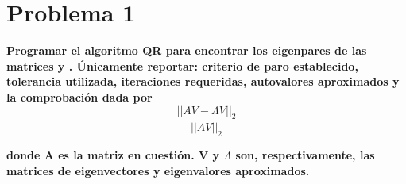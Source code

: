 \section*{Problema 1}
\textbf{Programar el algoritmo QR para encontrar los eigenpares de las matrices  y . Únicamente reportar: criterio de paro establecido, tolerancia utilizada, iteraciones requeridas, autovalores aproximados y la comprobación dada por}
\begin{equation*}
    \frac{||AV-\Lambda V||_2}{||AV||_2}
\end{equation*}

\textbf{donde A es la matriz en cuestión. V y $\Lambda$ son, respectivamente, las matrices de eigenvectores y eigenvalores aproximados.}
\pagebreak